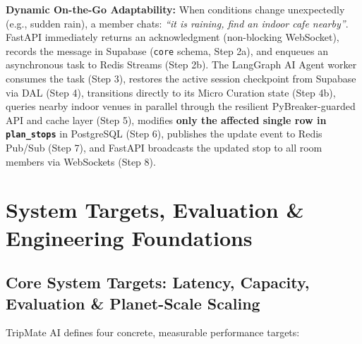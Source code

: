 \documentclass[11pt,a4paper]{article}
\begin{document}
\textbf{Dynamic On-the-Go Adaptability:} When conditions change unexpectedly (e.g., sudden rain), a member chats: \textit{``it is raining, find an indoor cafe nearby''}. FastAPI immediately returns an acknowledgment (non-blocking WebSocket), records the message in Supabase (\texttt{core} schema, Step 2a), and enqueues an asynchronous task to Redis Streams (Step 2b). The LangGraph AI Agent worker consumes the task (Step 3), restores the active session checkpoint from Supabase via DAL (Step 4), transitions directly to its Micro Curation state (Step 4b), queries nearby indoor venues in parallel through the resilient PyBreaker-guarded API and cache layer (Step 5), modifies \textbf{only the affected single row in \texttt{plan\_stops}} in PostgreSQL (Step 6), publishes the update event to Redis Pub/Sub (Step 7), and FastAPI broadcasts the updated stop to all room members via WebSockets (Step 8).

\clearpage
\section{System Targets, Evaluation \& Engineering Foundations}
\label{sec:nfr}

\subsection{Core System Targets: Latency, Capacity, Evaluation \& Planet-Scale Scaling}
\label{sec:system_targets}
\label{sec:latency_budget}
\label{sec:capacity_concurrency}

TripMate AI defines four concrete, measurable performance targets:
\end{document}

